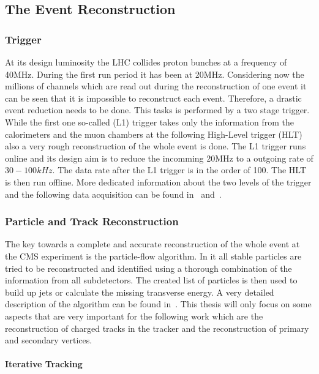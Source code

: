 \subsection{The Event Reconstruction \label{LHCCMSEventReco}}

\subsubsection{Trigger}

At its design luminosity the LHC collides proton bunches at a frequency of 40\unit{MHz}. During the first run period it has been at 20\unit{MHz}. Considering now the millions of channels which are read out during the reconstruction of one event it can be seen that it is impossible to reconstruct each event. Therefore, a drastic event reduction needs to be done. This tasks is performed by a two stage trigger. While the first one so-called \Lone{} (L1) trigger takes only the information from the calorimeters and the muon chambers at the following High-Level trigger (HLT) also a very rough reconstruction of the whole event is done. The L1 trigger runs online and its design aim is to reduce the incomming 20\unit{MHz} to a outgoing rate of $30-100\unit{kHz}$. The data rate after the L1 trigger is in the order of 100\GBytes{}. The HLT is then run offline. More dedicated information about the two levels of the trigger and the following data acquisition can be found in~ and~.

\subsubsection{Particle and Track Reconstruction}

The key towards a complete and accurate reconstruction of the whole event at the CMS experiment is the particle-flow algorithm. In it all stable particles are tried to be reconstructed and identified using a thorough combination of the information from all subdetectors. The created list of particles is then used to build up jets or calculate the missing transverse energy. A very detailed description of the algorithm can be found in~. This thesis will only focus on some aspects that are very important for the following work which are the reconstruction of charged tracks in the tracker and the reconstruction of primary and secondary vertices.

\paragraph{Iterative Tracking}

